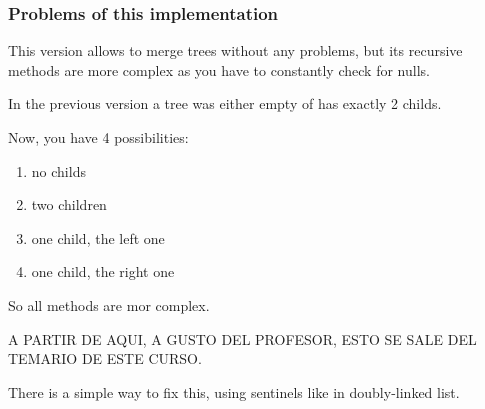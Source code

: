 \documentclass[a4paper, 9pt]{extarticle}
\begin{document}
\newpage
\subsubsection{Problems of this implementation}

This version allows to merge trees without any problems, but its recursive
methods are more complex as you have to constantly check for nulls.

In the previous version a tree was either empty of has exactly 2 childs.

Now, you have 4 possibilities:

\begin{enumerate}

  \item no childs

  \item two children

  \item one child, the left one

  \item one child, the right one

\end{enumerate}

So all methods are mor complex.

A PARTIR DE AQUI, A GUSTO DEL PROFESOR, ESTO SE SALE DEL TEMARIO DE ESTE CURSO.

There is a simple way to fix this, using sentinels like in doubly-linked list.

\begin{multicols}{2}
\end{multicols}
\end{document}
